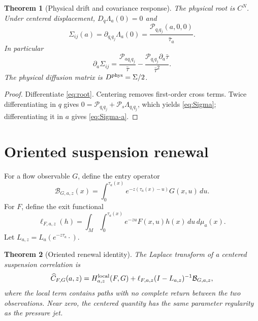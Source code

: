 \documentclass[11pt,reqno]{amsart}
\newtheorem{theorem}{Theorem}[section]
\theoremstyle{definition}
\theoremstyle{remark}
\begin{document}
\begin{theorem}[Physical drift and covariance response]\label{thm:physical}
The physical root is $C^N$.  Under centered displacement,
$D_q\Lambda_a(0)=0$ and
\begin{equation}\label{eq:Sigma}
 \Sigma_{ij}(a)=\partial_{q_iq_j}\Lambda_a(0)
 =\frac{\mathscr P_{q_iq_j}(a,0,0)}{\bar\tau_a}.
\end{equation}
In particular
\begin{equation}\label{eq:Sigma-a}
 \partial_a\Sigma_{ij}
 =\frac{\mathscr P_{aq_iq_j}}{\bar\tau}
 -\frac{\mathscr P_{q_iq_j}\partial_a\bar\tau}{\bar\tau^2}.
\end{equation}
The physical diffusion matrix is $D^{\rm phys}=\Sigma/2$.
\end{theorem}

\begin{proof}
Differentiate \eqref{eq:root}.  Centering removes first-order cross terms.
Twice differentiating in $q$ gives
$0=\mathscr P_{q_iq_j}+\mathscr P_s\Lambda_{q_iq_j}$, which yields
\eqref{eq:Sigma}; differentiating it in $a$ gives \eqref{eq:Sigma-a}.
\end{proof}

\section{Oriented suspension renewal}\label{sec:renewal}

For a flow observable $G$, define the entry operator
\begin{equation}\label{eq:entry}
 \mathcal B_{G,a,z}(x)=
 \int_0^{\tau_a(x)}e^{-z(\tau_a(x)-u)}G(x,u)\,du.
\end{equation}
For $F$, define the exit functional
\begin{equation}\label{eq:exit}
 \ell_{F,a,z}(h)=
 \int_M\int_0^{\tau_a(x)}e^{-zu}F(x,u)h(x)\,du\,d\mu_a(x).
\end{equation}
Let $L_{a,z}=L_a(e^{-z\tau_a}\cdot)$.

\begin{theorem}[Oriented renewal identity]\label{thm:renewal}
The Laplace transform of a centered suspension correlation is
\begin{equation}\label{eq:renewal}
 \widehat C_{F,G}(a,z)=H_{a,z}^{\rm local}(F,G)
 +\ell_{F,a,z}(I-L_{a,z})^{-1}\mathcal B_{G,a,z},
\end{equation}
where the local term contains paths with no complete return between the two
observations.  Near zero, the centered quantity has the same parameter
regularity as the pressure jet.
\end{theorem}
\end{document}

